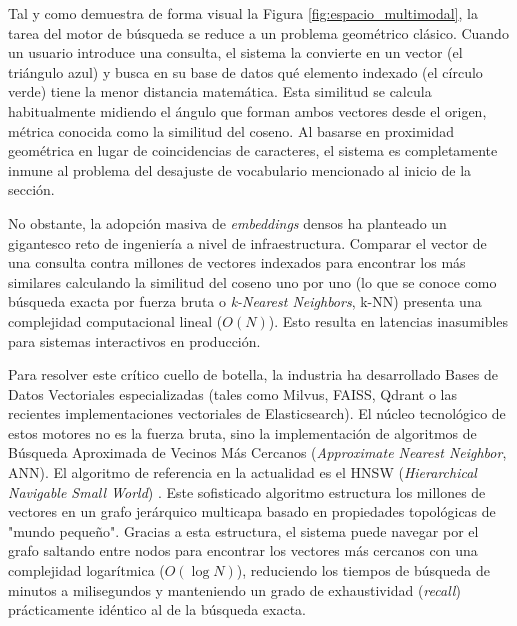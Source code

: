 \documentclass[a4paper]{report}
\begin{document}
Tal y como demuestra de forma visual la Figura \ref{fig:espacio_multimodal}, la tarea del motor de búsqueda se reduce a un problema geométrico clásico. Cuando un usuario introduce una consulta, el sistema la convierte en un vector (el triángulo azul) y busca en su base de datos qué elemento indexado (el círculo verde) tiene la menor distancia matemática. Esta similitud se calcula habitualmente midiendo el ángulo que forman ambos vectores desde el origen, métrica conocida como la similitud del coseno. Al basarse en proximidad geométrica en lugar de coincidencias de caracteres, el sistema es completamente inmune al problema del desajuste de vocabulario mencionado al inicio de la sección.

No obstante, la adopción masiva de \textit{embeddings} densos ha planteado un gigantesco reto de ingeniería a nivel de infraestructura. Comparar el vector de una consulta contra millones de vectores indexados para encontrar los más similares calculando la similitud del coseno uno por uno (lo que se conoce como búsqueda exacta por fuerza bruta o \textit{k-Nearest Neighbors}, k-NN) presenta una complejidad computacional lineal ($O(N)$). Esto resulta en latencias inasumibles para sistemas interactivos en producción. 

Para resolver este crítico cuello de botella, la industria ha desarrollado Bases de Datos Vectoriales especializadas (tales como Milvus, FAISS, Qdrant o las recientes implementaciones vectoriales de Elasticsearch). El núcleo tecnológico de estos motores no es la fuerza bruta, sino la implementación de algoritmos de Búsqueda Aproximada de Vecinos Más Cercanos (\textit{Approximate Nearest Neighbor}, ANN). El algoritmo de referencia en la actualidad es el HNSW (\textit{Hierarchical Navigable Small World}) \cite{malkov2018efficient}. Este sofisticado algoritmo estructura los millones de vectores en un grafo jerárquico multicapa basado en propiedades topológicas de "mundo pequeño". Gracias a esta estructura, el sistema puede navegar por el grafo saltando entre nodos para encontrar los vectores más cercanos con una complejidad logarítmica ($O(\log N)$), reduciendo los tiempos de búsqueda de minutos a milisegundos y manteniendo un grado de exhaustividad (\textit{recall}) prácticamente idéntico al de la búsqueda exacta.
\end{document}
